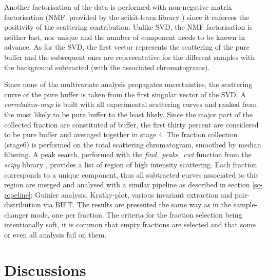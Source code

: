 \documentclass[preprint]{iucr}              %
\begin{document}
Another factorisation of the data is performed with non-negative matrix factorisation (NMF, provided by the scikit-learn library \cite{sklearn}) since it enforces the positivity of the scattering contribution. 
Unlike SVD, the NMF factorisation is neither fast, nor unique and the number of component needs to be known in advance.
As for the SVD, the first vector represents the scattering of the pure buffer and the subsequent ones 
are representative for the different samples with the background subtracted (with the associated chromatograms).

Since none of the multivariate analysis propagates uncertainties, the scattering curve of the pure buffer is taken from the first singular vector of the SVD.
A \textit{correlation-map} is built with all experimental scattering curves and ranked from the most likely to be pure buffer to the least likely. 
Since the major part of the collected fraction are constituted of buffer, the first thirty percent are considered to be pure buffer and averaged together in stage 4.
The fraction collection (stage6) is performed on the total scattering chromatogram, smoothed by median filtering. 
A peak search, performed with the \textit{find\_peaks\_cwt} function from the \textit{scipy} library \cite{scipy}, provides a list of region of high intensity scattering.
Each fraction corresponds to a unique component, thus all subtracted curves associated to this region are merged and analysed with a similar pipeline as described in section \ref{sc-pipeline}: Guinier analysis, Kratky-plot, various invariant extraction and pair-distribution via BIFT.
The results are presented the same way as in the sample-changer mode, one per fraction.
The criteria for the fraction selection being intentionally soft, it is common that empty fractions are selected and that some or even all analysis fail on them. 

\section{Discussions}
\end{document}
